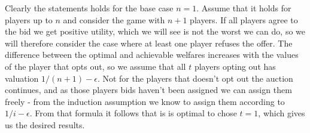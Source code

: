 Clearly the statements holds for the base case $n=1$. Assume that it holds for players up to $n$ and consider the game with $n+1$ players. If all players agree to the bid we get positive utility, which we will see is not the worst we can do, so we will therefore consider the case where at least one player refuses the offer. The difference between the optimal and achievable welfares increases with the values of the player that opts out, so we assume that all $t$ players opting out has valuation $1/(n+1)- \epsilon$. Not for the players that doesn't opt out the auction continues, and as those players bids haven't been assigned we can assign them freely - from the induction assumption we know to assign them according to $1/i - \epsilon$. From that formula it follows that is is optimal to chose $t=1$, which gives us the desired results.


